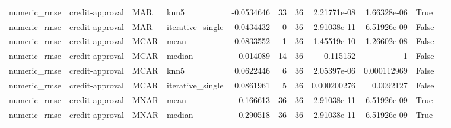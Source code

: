 \begin{table}[ht]
\begin{tabular}{llllrrrrrll}
 numeric\_rmse           & credit-approval      & MAR         & knn5             &     -0.0534646   &                  33 &      36 & 2.21771e-08 & 1.66328e-06 & True               &                                                                                                                    \\
 numeric\_rmse           & credit-approval      & MAR         & iterative\_single &      0.0434432   &                   0 &      36 & 2.91038e-11 & 6.51926e-09 & False              &                                                                                                                    \\
 numeric\_rmse           & credit-approval      & MCAR        & mean             &      0.0833552   &                   1 &      36 & 1.45519e-10 & 1.26602e-08 & False              &                                                                                                                    \\
 numeric\_rmse           & credit-approval      & MCAR        & median           &      0.014089    &                  14 &      36 & 0.115152    & 1           & False              &                                                                                                                    \\
 numeric\_rmse           & credit-approval      & MCAR        & knn5             &      0.0622446   &                   6 &      36 & 2.05397e-06 & 0.000112969 & False              &                                                                                                                    \\
 numeric\_rmse           & credit-approval      & MCAR        & iterative\_single &      0.0861961   &                   5 &      36 & 0.000200276 & 0.0092127   & False              &                                                                                                                    \\
 numeric\_rmse           & credit-approval      & MNAR        & mean             &     -0.166613    &                  36 &      36 & 2.91038e-11 & 6.51926e-09 & True               &                                                                                                                    \\
 numeric\_rmse           & credit-approval      & MNAR        & median           &     -0.290518    &                  36 &      36 & 2.91038e-11 & 6.51926e-09 & True               &                                                                                                                    \\

\end{tabular}
\end{table}
